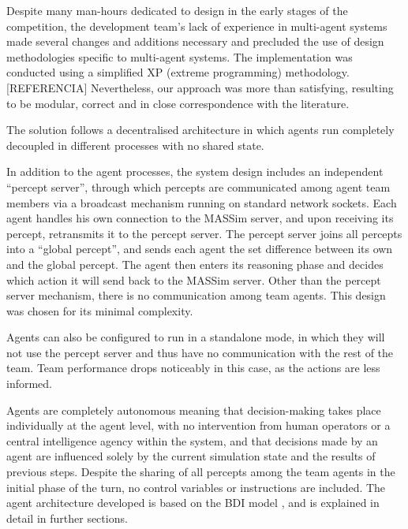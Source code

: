 \documentclass{llncs2e/llncs}
\begin{document}
    Despite many man-hours dedicated to design in the early stages of the
    competition, the development team's lack of experience in multi-agent
    systems made several changes and additions necessary and precluded the use
    of design methodologies specific to multi-agent systems.  The implementation
    was conducted using a simplified XP (extreme programming) methodology.
    [REFERENCIA] Nevertheless, our approach was more than satisfying, resulting
    to be modular, correct and in close correspondence with the literature.

    The solution follows a decentralised architecture in which agents run
    completely decoupled in different processes with no shared state. 
    
    In addition to the agent processes, the system design includes an
    independent ``percept server'', through which percepts are communicated
    among agent team members via a broadcast mechanism running on standard
    network sockets.  Each agent handles his own connection to the MASSim
    server, and upon receiving its percept, retransmits it to the percept
    server.  The percept server joins all percepts into a ``global percept'',
    and sends each agent the set difference between its own and the global
    percept.  The agent then enters its reasoning phase and decides which
    action it will send back to the MASSim server.  Other than the percept
    server mechanism, there is no communication among team agents. This design
    was chosen for its minimal complexity.

    Agents can also be configured to run in a standalone mode, in which they will
    not use the percept server and thus have no communication with the rest of
    the team.  Team performance drops noticeably in this case, as the actions
    are less informed. 

    Agents are completely autonomous meaning that decision-making takes place
    individually at the agent level, with no intervention from human operators
    or a central intelligence agency within the system, and that decisions made
    by an agent are influenced solely by the current simulation state and the
    results of previous steps.  
    Despite the sharing of all percepts among the team agents in the initial
    phase of the turn, no control variables or instructions are included. 
    The agent architecture developed is based on the
    BDI model \cite{Rao:1991}, and is explained in detail in further sections.
\end{document}
